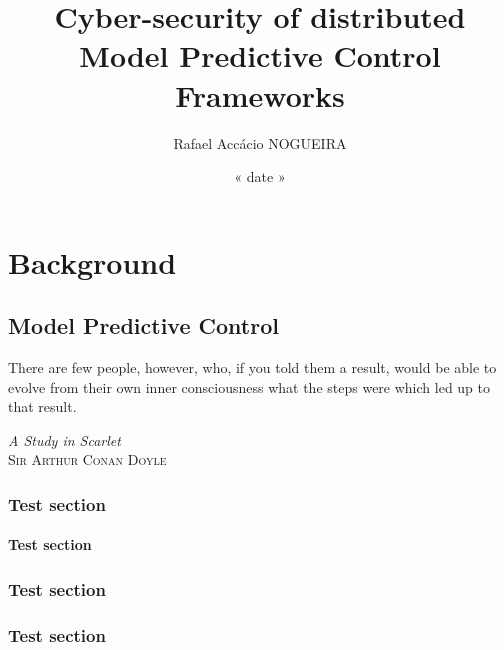 \documentclass{these-dbl}
\author{Rafael Accácio NOGUEIRA}
\title{Cyber-security of distributed Model Predictive Control Frameworks}
\date{« date »}
\begin{document}
\dominitoc

\maketitle


% 

\tableofcontents %

% 

\listofacronyms
\listoffigures
\listoftables
\printglossary


% 
%

\mainmatter

% 

%

\part{Background}
\minitoc
\chapter{Model Predictive Control}
\epigraph{\centering There are few people, however, who, if you told them a result, would be able to evolve from their own inner consciousness what the steps were which led up to that result.}
{\textit{A Study in Scarlet}\\ \textsc{Sir Arthur Conan Doyle}}
\minitoc

\section{Test section}

\subsection{Test section}
\section{Test section}
\section{Test section}
\end{document}
